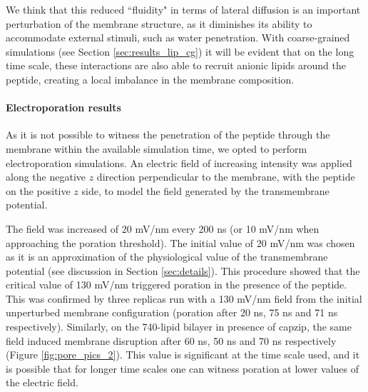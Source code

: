 We think that this reduced ``fluidity" in terms of lateral diffusion is an important perturbation of the membrane structure, as it diminishes its ability to accommodate external stimuli, such as water penetration. With coarse-grained simulations (see Section \ref{sec:results_lip_cg}) it will be evident that on the long time scale, these interactions are also able to recruit anionic lipids around the peptide, creating a local imbalance in the membrane composition.


\paragraph{Electroporation results}
As it is not possible to witness the penetration of the peptide through the membrane within the available simulation time, we opted to perform electroporation simulations.
%
An electric field of increasing intensity was applied along the negative $z$ direction perpendicular to the membrane, with the peptide on the positive $z$ side, to model the field generated by the transmembrane potential.

The field was increased of 20 mV/nm every 200 ns (or 10 mV/nm when approaching the poration threshold). The initial value of 20 mV/nm was chosen as it is an approximation of the physiological value of the transmembrane potential (see discussion in Section \ref{sec:details}). This procedure showed that the critical value of 130 mV/nm triggered poration in the presence of the peptide. 
%
This was confirmed by three replicas run with a 130 mV/nm field from the initial unperturbed membrane configuration (poration after 20 ns, 75 ns and 71 ns respectively).
%
Similarly, on the 740-lipid bilayer in presence of capzip, the same field induced membrane disruption after 60 ns, 50 ns and 70 ns respectively (Figure \ref{fig:pore_pics_2}).
%
This value is significant at the time scale used, and it is possible that for longer time scales one can witness poration at lower values of the electric field.

